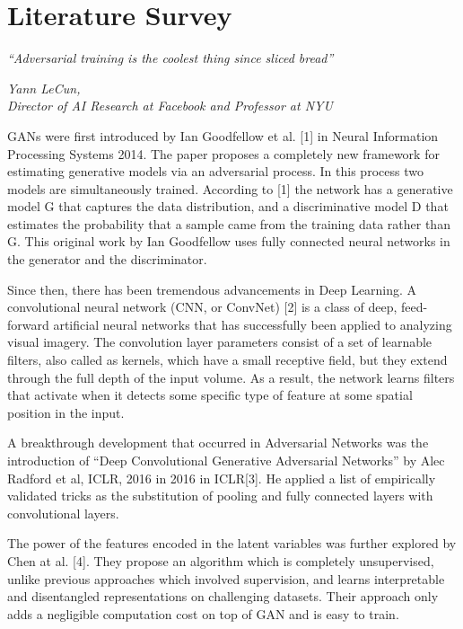 \chapter{Literature Survey}\label{ch:literature_survey}
\epigraph{\textit{\Large “Adversarial training is the coolest thing since sliced bread”}}{\textit{ \large Yann LeCun,\\ Director of AI Research at Facebook and Professor at NYU}}


GANs were first introduced by Ian Goodfellow et al. [1] in Neural Information Processing Systems 2014. The paper proposes a completely new framework for estimating generative models via an adversarial process. In this process two models are simultaneously trained. According to [1] the network has a generative model G that captures the data distribution, and a discriminative model D that estimates the probability that a sample came from the training data rather than G. This original work by Ian Goodfellow uses fully connected neural networks in the generator and the discriminator. 
\par\bigskip


Since then, there has been tremendous advancements in Deep Learning. A convolutional neural network (CNN, or ConvNet) [2] is a class of deep, feed-forward artificial neural networks that has successfully been applied to analyzing visual imagery. The convolution layer parameters consist of a set of learnable filters, also called as kernels, which have a small receptive field, but they extend through the full depth of the input volume. As a result, the network learns filters that activate when it detects some specific type of feature at some spatial position in the input.
\par\bigskip

A breakthrough development that occurred in Adversarial Networks was the introduction of “Deep Convolutional Generative Adversarial Networks” by Alec Radford et al, ICLR, 2016 in 2016 in ICLR[3]. He applied a list of empirically validated tricks as the substitution of pooling and fully connected layers with convolutional layers.
\par\bigskip

The power of the features encoded in the latent variables was further explored by Chen at al. [4]. They propose an algorithm which is completely unsupervised, unlike previous approaches which involved supervision, and learns interpretable and disentangled representations on challenging datasets. Their approach only adds a negligible computation cost on top of GAN and is easy to train.
\par\bigskip

